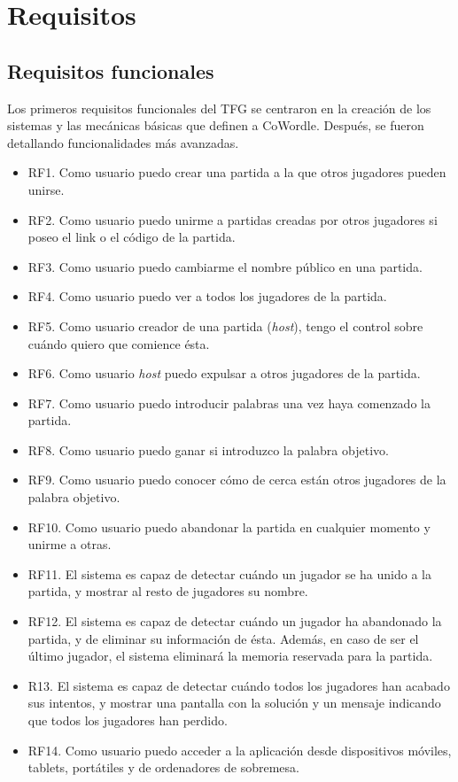 \section{Requisitos}

\subsection{Requisitos funcionales}

Los primeros requisitos funcionales del TFG se centraron en la creación de los sistemas y las mecánicas básicas que definen a CoWordle. Después, se fueron detallando funcionalidades más avanzadas.

\begin{itemize}
	\item RF1. Como usuario puedo crear una partida a la que otros jugadores pueden unirse.
	\item RF2. Como usuario puedo unirme a partidas creadas por otros jugadores si poseo el link o el código de la partida.
	\item RF3. Como usuario puedo cambiarme el nombre público en una partida.
	\item RF4. Como usuario puedo ver a todos los jugadores de la partida.
	\item RF5. Como usuario creador de una partida (\textit{host}), tengo el control sobre cuándo quiero que comience ésta.
	\item RF6. Como usuario \textit{host} puedo expulsar a otros jugadores de la partida.
	\item RF7. Como usuario puedo introducir palabras una vez haya comenzado la partida.
	\item RF8. Como usuario puedo ganar si introduzco la palabra objetivo.
	\item RF9. Como usuario puedo conocer cómo de cerca están otros jugadores de la palabra objetivo.
	\item RF10. Como usuario puedo abandonar la partida en cualquier momento y unirme a otras.
	\item RF11. El sistema es capaz de detectar cuándo un jugador se ha unido a la partida, y mostrar al resto de jugadores su nombre.
	\item RF12. El sistema es capaz de detectar cuándo un jugador ha abandonado la partida, y de eliminar su información de ésta. Además, en caso de ser el último jugador, el sistema eliminará la memoria reservada para la partida.
	\item R13. El sistema es capaz de detectar cuándo todos los jugadores han acabado sus intentos, y mostrar una pantalla con la solución y un mensaje indicando que todos los jugadores han perdido.
	\item RF14. Como usuario puedo acceder a la aplicación desde dispositivos móviles, tablets, portátiles y de ordenadores de sobremesa. 
\end{itemize}

